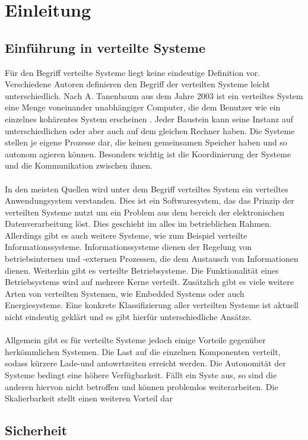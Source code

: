 
\chapter{Einleitung}

\section{Einführung in verteilte Systeme}
Für den Begriff \glqq verteilte Systeme \grqq{} liegt keine eindeutige Definition vor. Verschiedene Autoren definieren den Begriff der verteilten Systeme leicht unterschiedlich.
Nach A. Tanenbaum aus dem Jahre 2003 ist ein verteiltes System eine Menge voneinander unabhängiger Computer, die dem Benutzer wie ein einzelnes kohärentes System
erscheinen \cite{Mandl.2009}. Jeder Baustein kann seine Instanz auf unterschiedlichen oder aber auch auf dem gleichen Rechner haben. Die Systeme stellen je eigene Prozesse dar, die keinen gemeinsamen
Speicher haben und so autonom agieren können. Besonders wichtig ist die Koordinierung der Systeme und die Kommunikation zwischen ihnen. 
\\\\
In den meisten Quellen wird unter dem Begriff verteiltes System ein verteiltes Anwendungsystem verstanden. Dies ist ein Softwaresystem, das das Prinzip der verteilten Systeme nutzt um ein 
Problem aus dem bereich der elektronischen Datenverarbeitung löst. Dies geschieht im alles im betrieblichen Rahmen. Allerdings gibt es auch weitere Systeme, wie zum Beispiel verteilte Informationssysteme.
Informationssysteme dienen der Regelung von betriebsinternen und -externen Prozessen, die dem Austausch von Informationen dienen. Weiterhin gibt es verteilte Betriebsysteme.
Die Funktionalität eines Betriebsystems wird auf mehrere Kerne verteilt. Zusätzlich gibt es viele weitere Arten von verteilten Systemen, wie Embedded Systems oder auch Energiesysteme. Eine konkrete Klassifizierung aller verteilten Systeme ist aktuell nicht eindeutig geklärt und es gibt hierfür unterschiedliche
Ansätze.
\\\\
Allgemein gibt es für verteilte Systeme jedoch einige Vorteile gegenüber herkömmlichen Systemen. Die Last auf die einzelnen Komponenten verteilt, sodass kürzere Lade-und antowrtzeiten erreicht werden.
Die Autonomität der Systeme bedingt eine höhere Verfügbarkeit. Fällt ein Syste aus, so sind die anderen hiervon nicht betroffen und können problemlos weiterarbeiten. Die Skalierbarkeit stellt
einen weiteren Vorteil dar

\section{Sicherheit}